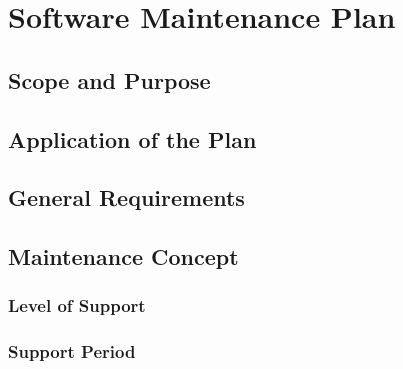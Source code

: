 \chapter{Software Maintenance Plan}
\label{chapter:maintenance}

\section{Scope and Purpose}

\section{Application of the Plan}

\section{General Requirements}

\section{Maintenance Concept}

\subsection{Level of Support}

\subsection{Support Period}

